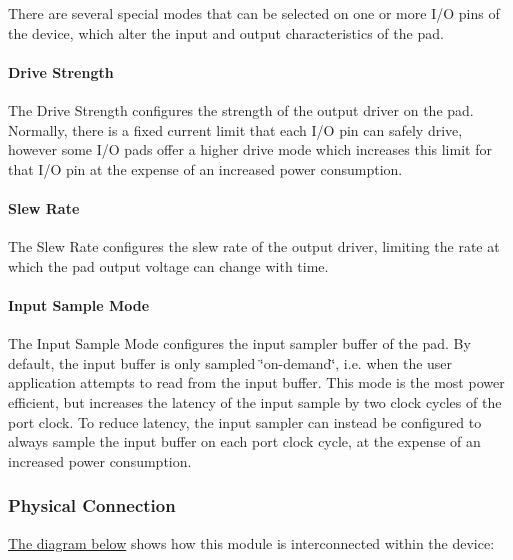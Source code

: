 There are several special modes that can be selected on one or more I/\+O pins of the device, which alter the input and output characteristics of the pad.\hypertarget{group__asfdoc__sam0__system__pinmux__group_asfdoc_sam0_system_pinmux_drive_strength}{}\paragraph{Drive Strength}\label{group__asfdoc__sam0__system__pinmux__group_asfdoc_sam0_system_pinmux_drive_strength}
The Drive Strength configures the strength of the output driver on the pad. Normally, there is a fixed current limit that each I/\+O pin can safely drive, however some I/\+O pads offer a higher drive mode which increases this limit for that I/\+O pin at the expense of an increased power consumption.\hypertarget{group__asfdoc__sam0__system__pinmux__group_asfdoc_sam0_system_pinmux_slew_rate}{}\paragraph{Slew Rate}\label{group__asfdoc__sam0__system__pinmux__group_asfdoc_sam0_system_pinmux_slew_rate}
The Slew Rate configures the slew rate of the output driver, limiting the rate at which the pad output voltage can change with time.\hypertarget{group__asfdoc__sam0__system__pinmux__group_asfdoc_sam0_system_pinmux_input_sample_mode}{}\paragraph{Input Sample Mode}\label{group__asfdoc__sam0__system__pinmux__group_asfdoc_sam0_system_pinmux_input_sample_mode}
The Input Sample Mode configures the input sampler buffer of the pad. By default, the input buffer is only sampled \char`\"{}on-\/demand\char`\"{}, i.\+e. when the user application attempts to read from the input buffer. This mode is the most power efficient, but increases the latency of the input sample by two clock cycles of the port clock. To reduce latency, the input sampler can instead be configured to always sample the input buffer on each port clock cycle, at the expense of an increased power consumption.\hypertarget{group__asfdoc__sam0__system__pinmux__group_asfdoc_sam0_system_pinmux_module_overview_physical}{}\subsubsection{Physical Connection}\label{group__asfdoc__sam0__system__pinmux__group_asfdoc_sam0_system_pinmux_module_overview_physical}
\hyperlink{group__asfdoc__sam0__system__pinmux__group_asfdoc_sam0_system_pinmux_intconnections}{The diagram below} shows how this module is interconnected within the device\+:

